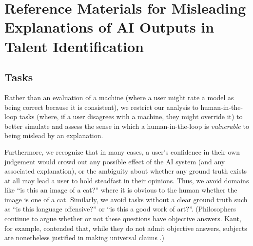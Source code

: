 

\chapter{\label{app:misleadingexplanations}Reference Materials for Misleading Explanations of AI Outputs in Talent Identification}

\minitoc

\section{Tasks}\label{sec:tasks}
Rather than an evaluation of a machine (where a user might rate a model as being correct because it is consistent), we restrict our analysis to human-in-the-loop tasks (where, if a user disagrees with a machine, they might override it) to better simulate and assess the sense in which a human-in-the-loop is \emph{vulnerable} to being mislead by an explanation.

Furthermore, we recognize that in many cases, a user's confidence in their own judgement would crowd out any possible effect of the AI system (and any associated explanation), or the ambiguity about whether any ground truth exists at all may lead a user to hold steadfast in their opinions. Thus, we avoid domains like ``is this an image of a cat?'' where it is obvious to the human whether the image is one of a cat. Similarly, we avoid tasks without a clear ground truth such as ``is this language offensive?'' or ``is this a good work of art?''. (Philosophers continue to argue whether or not these questions have objective answers. Kant, for example, contended that, while they do not admit objective answers, subjects are nonetheless justified in making universal claims \cite{zangwill_aesthetic_2023}.)

